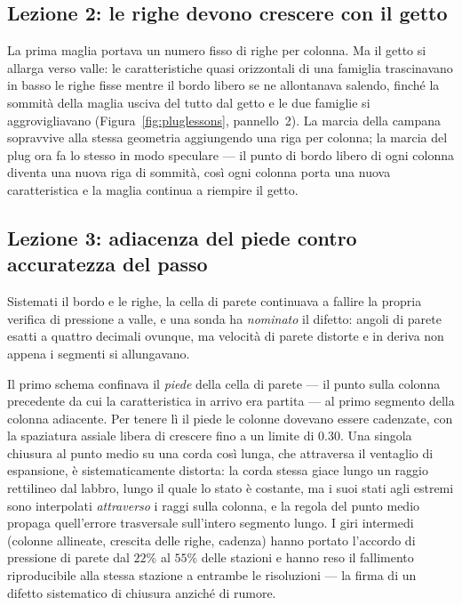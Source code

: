 \subsection{Lezione 2: le righe devono crescere con il getto}

La prima maglia portava un numero fisso di righe per colonna. Ma il
getto si allarga verso valle: le caratteristiche quasi orizzontali di
una famiglia trascinavano in basso le righe fisse mentre il bordo
libero se ne allontanava salendo, finché la sommità della maglia
usciva del tutto dal getto e le due famiglie si aggrovigliavano
(Figura~\ref{fig:pluglessons}, pannello~2). La marcia della campana
sopravvive alla stessa geometria aggiungendo una riga per colonna; la
marcia del plug ora fa lo stesso in modo speculare --- il punto di
bordo libero di ogni colonna diventa una nuova riga di sommità, così
ogni colonna porta una nuova caratteristica e la maglia continua a
riempire il getto.

\subsection{Lezione 3: adiacenza del piede contro accuratezza del
passo}
\label{app:footbias}

Sistemati il bordo e le righe, la cella di parete continuava a
fallire la propria verifica di pressione a valle, e una sonda ha
\emph{nominato} il difetto: angoli di parete esatti a quattro decimali
ovunque, ma velocità di parete distorte e in deriva non appena i
segmenti si allungavano.

Il primo schema confinava il \emph{piede} della cella di parete --- il
punto sulla colonna precedente da cui la caratteristica in arrivo era
partita --- al primo segmento della colonna adiacente. Per tenere lì
il piede le colonne dovevano essere cadenzate, con la spaziatura
assiale libera di crescere fino a un limite di $0.30$. Una singola
chiusura al punto medio su una corda così lunga, che attraversa il
ventaglio di espansione, è sistematicamente distorta: la corda stessa
giace lungo un raggio rettilineo dal labbro, lungo il quale lo stato è
costante, ma i suoi stati agli estremi sono interpolati
\emph{attraverso} i raggi sulla colonna, e la regola del punto medio
propaga quell'errore trasversale sull'intero segmento lungo. I giri
intermedi (colonne allineate, crescita delle righe, cadenza) hanno
portato l'accordo di pressione di parete dal $22\%$ al $55\%$ delle
stazioni e hanno reso il fallimento riproducibile alla stessa
stazione a entrambe le risoluzioni --- la firma di un difetto
sistematico di chiusura anziché di rumore.

